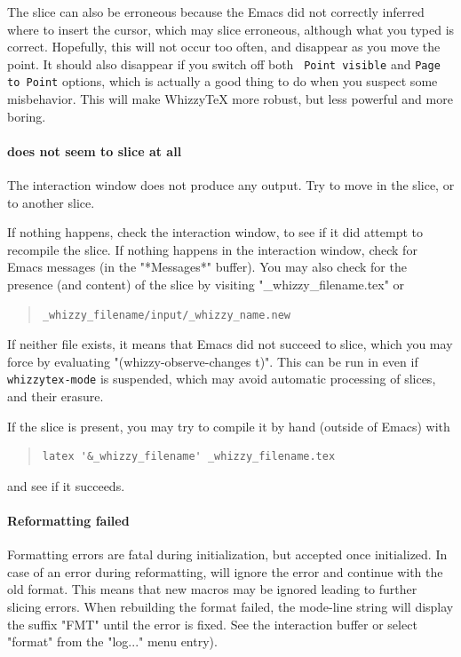 \documentclass[12pt]{article}
\begin{document}
The slice can also be erroneous because the Emacs did not correctly inferred
where to insert the cursor, which may slice erroneous, although what you
typed is correct. Hopefully, this will not occur too often, and disappear as
you move the point. It should also disappear if you switch off both {\tt
Point visible} and {\tt Page to Point} options, which is actually a good
thing to do when you suspect some misbehavior.  This will make WhizzyTeX
more robust, but less powerful and more boring.

\paragraph {\whizzy\space does not seem to slice at all}

The interaction window does not produce any output. 
Try to move in the slice, or to another slice. 

If nothing happens, check the interaction
window, to see if it did attempt to recompile the slice.
If nothing happens in the interaction window, check for Emacs messages
(in the \lst"*Messages*" buffer). You may also check for the presence 
(and content) of the slice by visiting 
\lst"_whizzy_filename.tex" or
\begin{quote}
\begin{verbatim}
_whizzy_filename/input/_whizzy_name.new
\end{verbatim}
\end{quote}
If neither file exists, it means that Emacs did
not succeed to slice, which you may force by evaluating
\lst"(whizzy-observe-changes t)". 
This can be run in even if {\tt whizzytex-mode} is suspended, which may
avoid automatic processing of slices, and their erasure.

If the slice is present, you may try to compile it by hand (outside of
Emacs) with 
\begin{quote}
\begin{verbatim}
latex '&_whizzy_filename' _whizzy_filename.tex
\end{verbatim}
\end{quote}
and see if it succeeds. 


\paragraph {Reformatting failed}

Formatting errors are fatal during initialization, but accepted once
initialized. In case of an error during reformatting, {\whizzy} will ignore
the error and continue with the old format.  This means that new macros may
be ignored leading to further slicing errors. When rebuilding the format
failed, the mode-line string will display the suffix \lst"FMT" until the
error is fixed.  See the interaction buffer or select \lst"format" from the
\lst"log..." menu entry).
\end{document}
